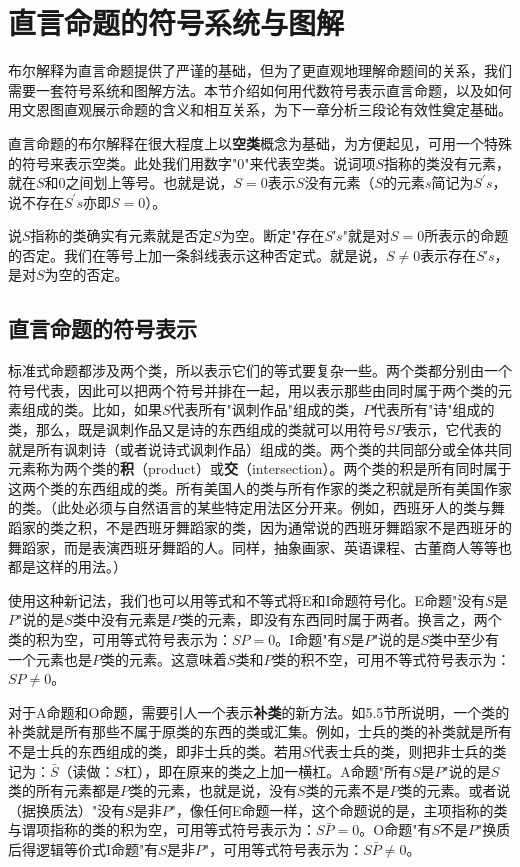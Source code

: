 \section{直言命题的符号系统与图解}

\begin{logicbox}[title=章节导读]
布尔解释为直言命题提供了严谨的基础，但为了更直观地理解命题间的关系，我们需要一套符号系统和图解方法。本节介绍如何用代数符号表示直言命题，以及如何用文恩图直观展示命题的含义和相互关系，为下一章分析三段论有效性奠定基础。
\end{logicbox}

直言命题的布尔解释在很大程度上以\textbf{空类}概念为基础，为方便起见，可用一个特殊的符号来表示空类。此处我们用数字"0"来代表空类。说词项$S$指称的类没有元素，就在$S$和0之间划上等号。也就是说，$S=0$表示$S$没有元素（$S$的元素$s$简记为$S^{\prime}s$，说不存在$S^{\prime}s$亦即$S=0$）。

说$S$指称的类确实有元素就是否定$S$为空。断定"存在$S$′$s$"就是对$S=0$所表示的命题的否定。我们在等号上加一条斜线表示这种否定式。就是说，$S \neq 0$表示存在$S$′$s$，是对$S$为空的否定。

\subsection{直言命题的符号表示}

标准式命题都涉及两个类，所以表示它们的等式要复杂一些。两个类都分别由一个符号代表，因此可以把两个符号并排在一起，用以表示那些由同时属于两个类的元素组成的类。比如，如果$S$代表所有"讽刺作品"组成的类，$P$代表所有"诗"组成的类，那么，既是讽刺作品又是诗的东西组成的类就可以用符号$SP$表示，它代表的就是所有讽刺诗（或者说诗式讽刺作品）组成的类。两个类的共同部分或全体共同元素称为两个类的\textbf{积}（product）或\textbf{交}（intersection）。两个类的积是所有同时属于这两个类的东西组成的类。所有美国人的类与所有作家的类之积就是所有美国作家的类。（此处必须与自然语言的某些特定用法区分开来。例如，西班牙人的类与舞蹈家的类之积，不是西班牙舞蹈家的类，因为通常说的西班牙舞蹈家不是西班牙的舞蹈家，而是表演西班牙舞蹈的人。同样，抽象画家、英语课程、古董商人等等也都是这样的用法。）

使用这种新记法，我们也可以用等式和不等式将E和I命题符号化。E命题"没有$S$是$P$"说的是$S$类中没有元素是$P$类的元素，即没有东西同时属于两者。换言之，两个类的积为空，可用等式符号表示为：$SP=0$。I命题"有$S$是$P$"说的是$S$类中至少有一个元素也是$P$类的元素。这意味着$S$类和$P$类的积不空，可用不等式符号表示为：$SP \neq 0$。

对于A命题和O命题，需要引人一个表示\textbf{补类}的新方法。如5.5节所说明，一个类的补类就是所有那些不属于原类的东西的类或汇集。例如，士兵的类的补类就是所有不是士兵的东西组成的类，即非士兵的类。若用$S$代表士兵的类，则把非士兵的类记为：$\bar{S}$（读做：$S$杠），即在原来的类之上加一横杠。A命题"所有$S$是$P$"说的是$S$类的所有元素都是$P$类的元素，也就是说，没有$S$类的元素不是$P$类的元素。或者说（据换质法）"没有$S$是非$P$"，像任何E命题一样，这个命题说的是，主项指称的类与谓项指称的类的积为空，可用等式符号表示为：$S\bar{P}=0$。O命题"有$S$不是$P$"换质后得逻辑等价式I命题"有$S$是非$P$"，可用等式符号表示为：$S\bar{P} \neq 0$。

